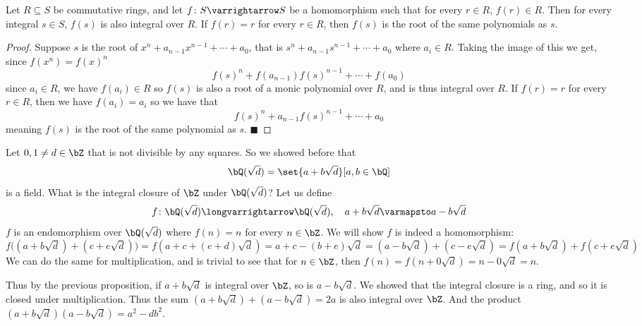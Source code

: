 \documentclass[10pt]{article}
\let\to=\varrightarrow
\let\longto=\longvarrightarrow
\def\qed{%
    \ifmmode%
        \eqno\blacksquare%
    \else%
        \hskip1cm\hbox{}\hfill$\blacksquare$%
    \fi%
}
\begin{document}


\bigskip

\begin{prop*}

    Let $R\subseteq S$ be commutative rings, and let $f\colon S\to S$ be a homomorphism such that for every $r\in R$, $f(r)\in R$.
    Then for every integral $s\in S$, $f(s)$ is also integral over $R$.
    If $f(r)=r$ for every $r\in R$, then $f(s)$ is the root of the same polynomials as $s$.

\end{prop*}

\begin{proof}

    Suppose $s$ is the root of $x^n+a_{n-1}x^{n-1}+\cdots+a_0$, that is $s^n+a_{n-1}s^{n-1}+\cdots+a_0$ where $a_i\in R$.
    Taking the image of this we get, since $f(x^n)=f(x)^n$
    \[ f(s)^n+f(a_{n-1})f(s)^{n-1}+\cdots+f(a_0) \]
    since $a_i\in R$, we have $f(a_i)\in R$ so $f(s)$ is also a root of a monic polynomial over $R$, and is thus integral over $R$.
    If $f(r)=r$ for every $r\in R$, then we have $f(a_i)=a_i$ so we have that
    \[ f(s)^n+a_{n-1}f(s)^{n-1}+\cdots+a_0 \]
    meaning $f(s)$ is the root of the same polynomial as $s$.
    \qed

\end{proof}

Let $0,1\neq d\in\bZ$ that is not divisible by any squares.
So we showed before that
\[ \bQ(\sqrt d) = \set{a+b\sqrt d}[a,b\in\bQ] \]
is a field.
What is the integral closure of $\bZ$ under $\bQ(\sqrt d)$?
Let us define
\[ f\colon\bQ(\sqrt d)\longto\bQ(\sqrt d),\quad a+b\sqrt d\varmapsto a-b\sqrt d \]
$f$ is an endomorphism over $\bQ(\sqrt d)$ where $f(n)=n$ for every $n\in\bZ$.
We will show $f$ is indeed a homomorphism:
\[ f\bigl((a+b\sqrt d) + (c+e\sqrt d)\bigr) = f(a+c+(e+d)\sqrt d) = a+c - (b+e)\sqrt d = (a - b\sqrt d) + (c - e\sqrt d) = f(a+b\sqrt d) + f(c+e\sqrt d) \]
We can do the same for multiplication, and is trivial to see that for $n\in\bZ$, then $f(n)=f(n+0\sqrt d)=n-0\sqrt d=n$.

Thus by the previous proposition, if $a+b\sqrt d$ is integral over $\bZ$, so is $a-b\sqrt d$.
We showed that the integral closure is a ring, and so it is closed under multiplication.
Thus the sum $(a+b\sqrt d) + (a-b\sqrt d)=2a$ is also integral over $\bZ$.
And the product $(a+b\sqrt d)(a-b\sqrt d)=a^2-db^2$.
\end{document}
